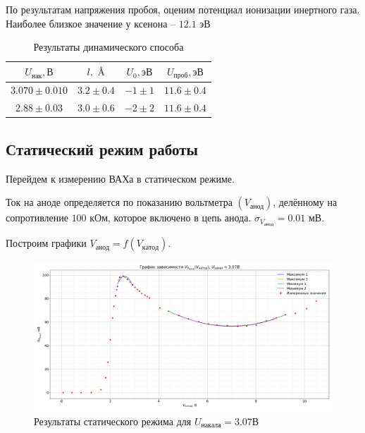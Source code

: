 \documentclass[a4paper, 12pt]{article}
\begin{document}
            По результатам напряжения пробоя, оценим потенциал ионизации инертного газа. Наиболее близкое значение у ксенона -- $12.1 \text{ эВ}$

            \begin{table}[!ht]
                \centering
                \begin{tabular}{|c|c|c|c|}
                    \hline

                    $U_{нак}, В$ & $l, \textup{~\AA}$ & $U_0, эВ$ & $U_{проб}, эВ$\\ \hline
                    $3.070 \pm 0.010$ & $3.2 \pm 0.4$ & $-1 \pm 1$ & $11.6 \pm 0.4$\\ \hline
                    $2.88 \pm 0.03$ & $3.0 \pm 0.6$ & $-2 \pm 2$ & $11.6 \pm 0.4$\\ \hline

                \end{tabular}
                \caption{Результаты динамического способа}
                \label{tab:dynamic_res}
            \end{table}

        \subsection{Статический режим работы}

            Перейдем к измерению ВАХа в статическом режиме.

            Ток на аноде определяется по показанию вольтметра $(V_{\text{анод}})$, делённому на сопротивление $100 \text{ кОм}$, которое включено в цепь анода. $\sigma_{V_{\text{анод}}} = 0.01 \text{ мВ}$.

            Построим графики $V_{анод} = f(V_{катод})$.

            \begin{figure}[!ht]
                \centering
                \includegraphics[width = 0.9\linewidth]{img/plot_static_3.07.png}
                \caption{Результаты статического режима для $U_{накала} = 3.07В$}
                \label{}
            \end{figure}
\end{document}
